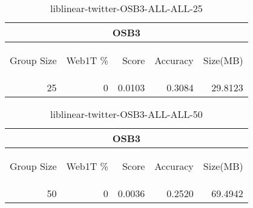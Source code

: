 \begin{center}
\begin{table}[htbp] 
 \begin{center}
\begin{tabular}{ | r | r | r | r | r |}
\hline
\multicolumn{5}{|c|}{OSB3}\\
\hline
\begin{sideways}Group Size\end{sideways} & \begin{sideways}Web1T \%\end{sideways} & \begin{sideways}Score\end{sideways} & \begin{sideways}Accuracy\end{sideways} & \begin{sideways}Size(MB)\end{sideways}\\
\hline
\multirow{0}{*}{25}
 & 0 & 0.0103 & 0.3084 & 29.8123\\ \cline{2-5}
\hline
\end{tabular}
\caption{liblinear-twitter-OSB3-ALL-ALL-25}
\label{table:liblinear-twitter-OSB3-ALL-ALL-25}
\end{center}
 \end{table}
\end{center}

\begin{center}
\begin{table}[htbp] 
 \begin{center}
\begin{tabular}{ | r | r | r | r | r |}
\hline
\multicolumn{5}{|c|}{OSB3}\\
\hline
\begin{sideways}Group Size\end{sideways} & \begin{sideways}Web1T \%\end{sideways} & \begin{sideways}Score\end{sideways} & \begin{sideways}Accuracy\end{sideways} & \begin{sideways}Size(MB)\end{sideways}\\
\hline
\multirow{0}{*}{50}
 & 0 & 0.0036 & 0.2520 & 69.4942\\ \cline{2-5}
\hline
\end{tabular}
\caption{liblinear-twitter-OSB3-ALL-ALL-50}
\label{table:liblinear-twitter-OSB3-ALL-ALL-50}
\end{center}
 \end{table}
\end{center}

